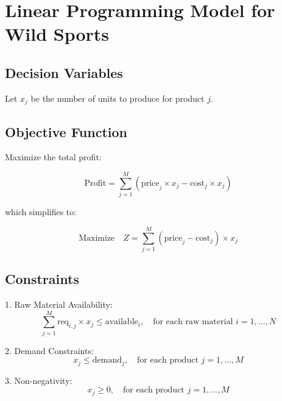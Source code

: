 \documentclass{article}
\begin{document}
\section*{Linear Programming Model for Wild Sports}

\subsection*{Decision Variables}
Let \( x_j \) be the number of units to produce for product \( j \).

\subsection*{Objective Function}
Maximize the total profit:

\[
\text{Profit} = \sum_{j=1}^{M} ( \text{price}_j \times x_j - \text{cost}_j \times x_j )
\]

which simplifies to:

\[
\text{Maximize} \quad Z = \sum_{j=1}^{M} ( \text{price}_j - \text{cost}_j ) \times x_j
\]

\subsection*{Constraints}

1. Raw Material Availability:
   \[
   \sum_{j=1}^{M} \text{req}_{i,j} \times x_j \leq \text{available}_i, \quad \text{for each raw material } i = 1, \dots, N
   \]

2. Demand Constraints:
   \[
   x_j \leq \text{demand}_j, \quad \text{for each product } j = 1, \dots, M
   \]

3. Non-negativity:
   \[
   x_j \geq 0, \quad \text{for each product } j = 1, \dots, M
   \]
\end{document}
